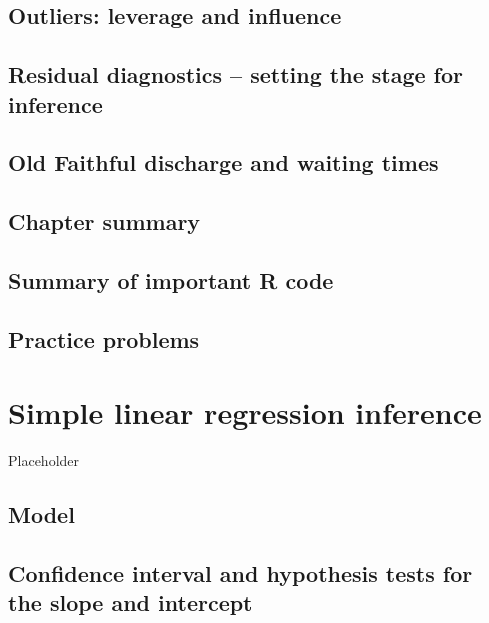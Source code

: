 \documentclass[]{book}
\begin{document}
\hypertarget{section6-9}{%
\section{Outliers: leverage and influence}\label{section6-9}}

\hypertarget{section6-10}{%
\section{Residual diagnostics -- setting the stage for inference}\label{section6-10}}

\hypertarget{section6-11}{%
\section{Old Faithful discharge and waiting times}\label{section6-11}}

\hypertarget{section6-12}{%
\section{Chapter summary}\label{section6-12}}

\hypertarget{section6-13}{%
\section{Summary of important R code}\label{section6-13}}

\hypertarget{section6-14}{%
\section{Practice problems}\label{section6-14}}

\hypertarget{chapter7}{%
\chapter{Simple linear regression inference}\label{chapter7}}

Placeholder

\hypertarget{section7-1}{%
\section{Model}\label{section7-1}}

\hypertarget{section7-2}{%
\section{Confidence interval and hypothesis tests for the slope and intercept}\label{section7-2}}
\end{document}
